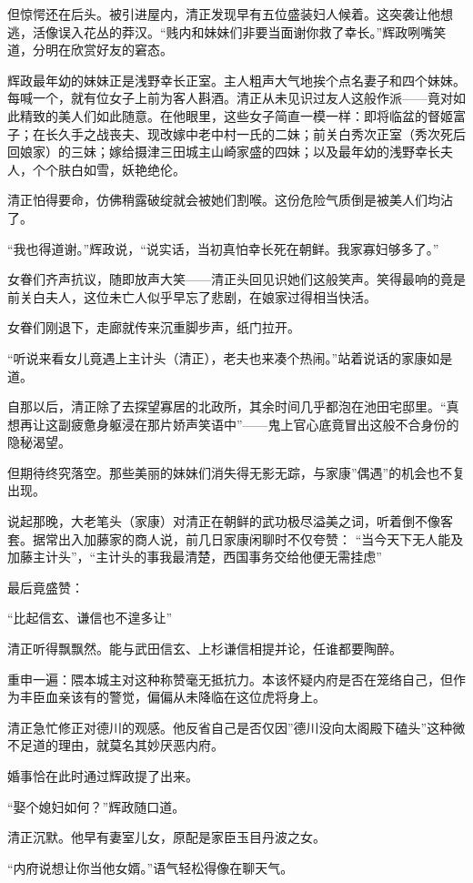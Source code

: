 \documentclass[
]{article}
\begin{document}
但惊愕还在后头。被引进屋内，清正发现早有五位盛装妇人候着。这突袭让他想逃，活像误入花丛的莽汉。``贱内和妹妹们非要当面谢你救了幸长。''辉政咧嘴笑道，分明在欣赏好友的窘态。

辉政最年幼的妹妹正是浅野幸长正室。主人粗声大气地挨个点名妻子和四个妹妹。每喊一个，就有位女子上前为客人斟酒。清正从未见识过友人这般作派------竟对如此精致的美人们如此随意。在他眼里，这些女子简直一模一样：即将临盆的督姬富子；在长久手之战丧夫、现改嫁中老中村一氏的二妹；前关白秀次正室（秀次死后回娘家）的三妹；嫁给摄津三田城主山崎家盛的四妹；以及最年幼的浅野幸长夫人，个个肤白如雪，妖艳绝伦。

清正怕得要命，仿佛稍露破绽就会被她们割喉。这份危险气质倒是被美人们均沾了。

``我也得道谢。''辉政说，``说实话，当初真怕幸长死在朝鲜。我家寡妇够多了。''

女眷们齐声抗议，随即放声大笑------清正头回见识她们这般笑声。笑得最响的竟是前关白夫人，这位未亡人似乎早忘了悲剧，在娘家过得相当快活。

女眷们刚退下，走廊就传来沉重脚步声，纸门拉开。

``听说来看女儿竟遇上主计头（清正），老夫也来凑个热闹。''站着说话的家康如是道。

自那以后，清正除了去探望寡居的北政所，其余时间几乎都泡在池田宅邸里。``真想再让这副疲惫身躯浸在那片娇声笑语中''------鬼上官心底竟冒出这般不合身份的隐秘渴望。

但期待终究落空。那些美丽的妹妹们消失得无影无踪，与家康''偶遇''的机会也不复出现。

说起那晚，大老笔头（家康）对清正在朝鲜的武功极尽溢美之词，听着倒不像客套。据常出入加藤家的商人说，前几日家康闲聊时不仅夸赞： ``当今天下无人能及加藤主计头''，``主计头的事我最清楚，西国事务交给他便无需挂虑''

最后竟盛赞：

``比起信玄、谦信也不遑多让''

清正听得飘飘然。能与武田信玄、上杉谦信相提并论，任谁都要陶醉。

重申一遍：隈本城主对这种称赞毫无抵抗力。本该怀疑内府是否在笼络自己，但作为丰臣血亲该有的警觉，偏偏从未降临在这位虎将身上。

清正急忙修正对德川的观感。他反省自己是否仅因''德川没向太阁殿下磕头''这种微不足道的理由，就莫名其妙厌恶内府。

婚事恰在此时通过辉政提了出来。

``娶个媳妇如何？''辉政随口道。

清正沉默。他早有妻室儿女，原配是家臣玉目丹波之女。

``内府说想让你当他女婿。''语气轻松得像在聊天气。
\end{document}
